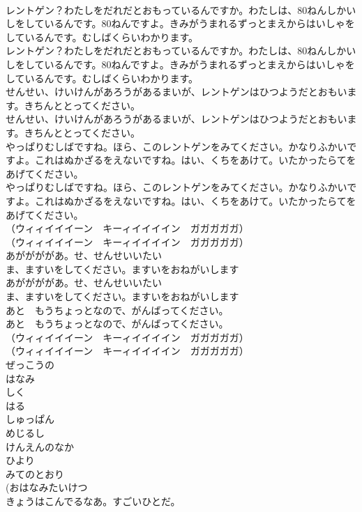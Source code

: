 \documentclass[8pt]{extreport}
\begin{document}
\begin{CJK}{UTF8}{min}
\\	レントゲン？わたしをだれだとおもっているんですか。わたしは、80ねんしかいしをしているんです。80ねんですよ。きみがうまれるずっとまえからはいしゃをしているんです。むしばくらいわかります。
\\	レントゲン？わたしをだれだとおもっているんですか。わたしは、80ねんしかいしをしているんです。80ねんですよ。きみがうまれるずっとまえからはいしゃをしているんです。むしばくらいわかります。
\\	せんせい、けいけんがあろうがあるまいが、レントゲンはひつようだとおもいます。きちんととってください。
\\	せんせい、けいけんがあろうがあるまいが、レントゲンはひつようだとおもいます。きちんととってください。
\\	やっぱりむしばですね。ほら、このレントゲンをみてください。かなりふかいですよ。これはぬかざるをえないですね。はい、くちをあけて。いたかったらてをあげてください。
\\	やっぱりむしばですね。ほら、このレントゲンをみてください。かなりふかいですよ。これはぬかざるをえないですね。はい、くちをあけて。いたかったらてをあげてください。
\\	（ウィィイイイーン　キーィイイイイン　ガガガガガ）
\\	（ウィィイイイーン　キーィイイイイン　ガガガガガ）
\\	あががががあ。せ、せんせいいたい
\\	ま、ますいをしてください。ますいをおねがいします
\\	あががががあ。せ、せんせいいたい
\\	ま、ますいをしてください。ますいをおねがいします
\\	あと　もうちょっとなので、がんばってください。
\\	あと　もうちょっとなので、がんばってください。
\\	（ウィィイイイーン　キーィイイイイン　ガガガガガ）
\\	（ウィィイイイーン　キーィイイイイン　ガガガガガ）
\\	ぜっこうの
\\	はなみ
\\	しく
\\	はる
\\	しゅっぱん
\\	めじるし
\\	けんえんのなか
\\	ひより
\\	みてのとおり
\\	(おはなみたいけつ 
\\	きょうはこんでるなあ。すごいひとだ。

\end{CJK}
\end{document}
